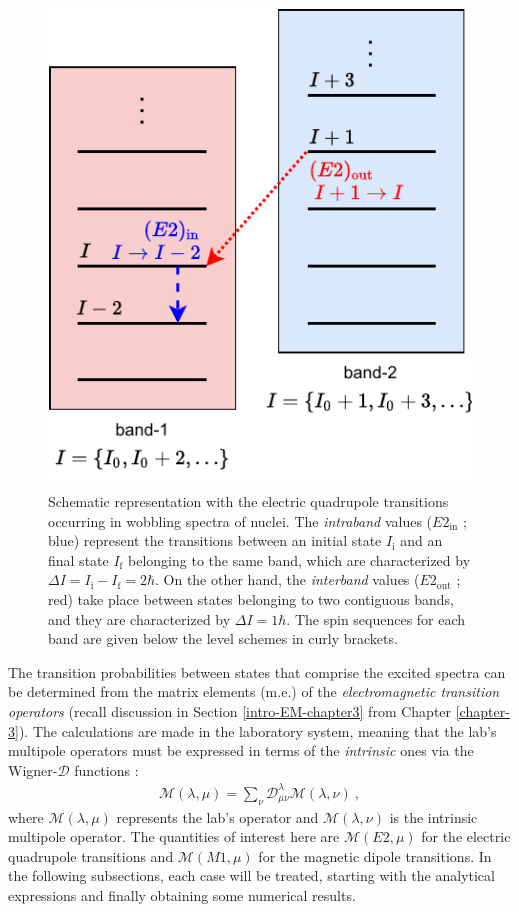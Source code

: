 \begin{figure}
    \centering
    \includegraphics[scale=1.1]{Chapters/Figures/transitions-wobbling-states.pdf}
    \caption{Schematic representation with the electric quadrupole transitions occurring in wobbling spectra of nuclei. The \emph{intraband} values ($E2_\text{in}$ ; blue) represent the transitions between an initial state $I_\text{i}$ and an final state $I_\text{f}$ belonging to the same band, which are characterized by $\Delta I=I_\text{i}-I_\text{f}=2\hbar$. On the other hand, the \emph{interband} values ($E2_\text{out}$ ; red) take place between states belonging to two contiguous bands, and they are characterized by $\Delta I=1\hbar$. The spin sequences for each band are given below the level schemes in curly brackets.}
    \label{schematic-interband-intraband-E2}
\end{figure}

The transition probabilities between states that comprise the excited spectra can be determined from the matrix elements (m.e.) of the \emph{electromagnetic transition operators} (recall discussion in Section \ref{intro-EM-chapter3} from Chapter \ref{chapter-3}). The calculations are made in the laboratory system, meaning that the lab's multipole operators must be expressed in terms of the \emph{intrinsic} ones via the Wigner-$\mathcal{D}$ functions \cite{toki1975asymmetric,bohr1998nuclear}:
\begin{align}
    \mathcal{M}(\lambda,\mu)=\sum_\nu\mathcal{D}_{\mu\nu}^\lambda\mathcal{M}(\lambda,\nu)\ ,
    \label{multipole-operator-lab}
\end{align}
where $\mathcal{M}(\lambda,\mu)$ represents the lab's operator and $\mathcal{M}(\lambda,\nu)$ is the intrinsic multipole operator. The quantities of interest here are $\mathcal{M}(E2,\mu)$ for the electric quadrupole transitions and $\mathcal{M}(M1,\mu)$ for the magnetic dipole transitions. In the following subsections, each case will be treated, starting with the analytical expressions and finally obtaining some numerical results.

